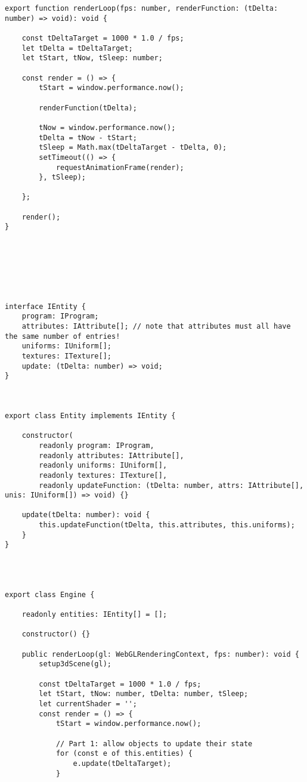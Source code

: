 {\begin{lstlisting}
export function renderLoop(fps: number, renderFunction: (tDelta: number) => void): void {

    const tDeltaTarget = 1000 * 1.0 / fps;
    let tDelta = tDeltaTarget;
    let tStart, tNow, tSleep: number;

    const render = () => {
        tStart = window.performance.now();

        renderFunction(tDelta);

        tNow = window.performance.now();
        tDelta = tNow - tStart;
        tSleep = Math.max(tDeltaTarget - tDelta, 0);
        setTimeout(() => {
            requestAnimationFrame(render);
        }, tSleep);

    };

    render();
}







interface IEntity {
    program: IProgram;
    attributes: IAttribute[]; // note that attributes must all have the same number of entries!
    uniforms: IUniform[];
    textures: ITexture[];
    update: (tDelta: number) => void;
}



export class Entity implements IEntity {

    constructor(
        readonly program: IProgram,
        readonly attributes: IAttribute[],
        readonly uniforms: IUniform[],
        readonly textures: ITexture[],
        readonly updateFunction: (tDelta: number, attrs: IAttribute[], unis: IUniform[]) => void) {}

    update(tDelta: number): void {
        this.updateFunction(tDelta, this.attributes, this.uniforms);
    }
}




export class Engine {

    readonly entities: IEntity[] = [];

    constructor() {}

    public renderLoop(gl: WebGLRenderingContext, fps: number): void {
        setup3dScene(gl);

        const tDeltaTarget = 1000 * 1.0 / fps;
        let tStart, tNow: number, tDelta: number, tSleep;
        let currentShader = '';
        const render = () => {
            tStart = window.performance.now();

            // Part 1: allow objects to update their state
            for (const e of this.entities) {
                e.update(tDeltaTarget);
            }


\end{lstlisting}}
